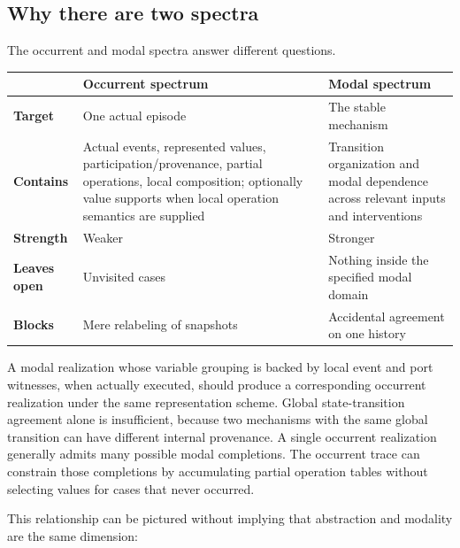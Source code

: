 \documentclass[11pt,a4paper]{article}
\begin{document}
\subsection{Why there are two spectra}

The occurrent and modal spectra answer different questions.

\begin{center}
\begin{tabularx}{\textwidth}{>{\RaggedRight\arraybackslash\bfseries}p{28mm}>{\RaggedRight\arraybackslash}X>{\RaggedRight\arraybackslash}X}
\toprule
 & Occurrent spectrum & Modal spectrum \\
\midrule
Target & One actual episode & The stable mechanism \\
Contains & Actual events, represented values, participation/provenance, partial operations, local composition; optionally value supports when local operation semantics are supplied & Transition organization and modal dependence across relevant inputs and interventions \\
Strength & Weaker & Stronger \\
Leaves open & Unvisited cases & Nothing inside the specified modal domain \\
Blocks & Mere relabeling of snapshots & Accidental agreement on one history \\
\bottomrule
\end{tabularx}
\end{center}

A modal realization whose variable grouping is backed by local event and port witnesses, when actually executed, should produce a corresponding occurrent realization under the same representation scheme. Global state-transition agreement alone is insufficient, because two mechanisms with the same global transition can have different internal provenance. A single occurrent realization generally admits many possible modal completions. The occurrent trace can constrain those completions by accumulating partial operation tables without selecting values for cases that never occurred.

This relationship can be pictured without implying that abstraction and modality are the same dimension:
\end{document}
